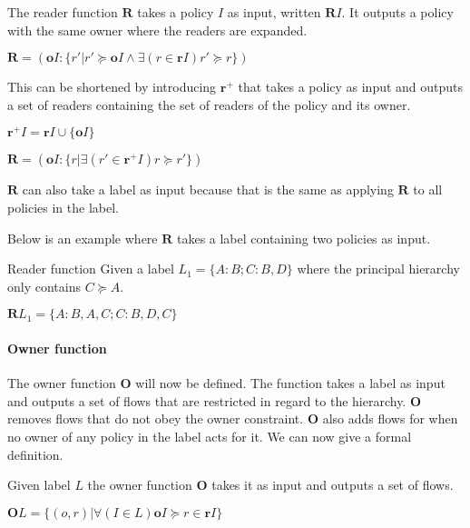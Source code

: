 \begin{definition}
  The reader function $\textbf{R}$ takes a policy $I$ as input, written $\textbf{R}I$.
  It outputs a policy with the same owner where the readers are expanded.
  \begin{center}
    $\textbf{R} = (\textbf{o}I : \{r' | r' \succeq \textbf{o}I \wedge \exists(r \in \textbf{r}I) r' \succeq r \})$
  \end{center}
  This can be shortened by introducing $\textbf{r}^+$ that takes a policy as input and outputs a set of readers containing the set of readers of the policy and its owner.
  \begin{center}
    $\textbf{r}^+I = \textbf{r}I \cup \{\textbf{o}I\}$
  \end{center}
  \begin{center}
    $\textbf{R} = (\textbf{o}I : \{r | \exists(r' \in \textbf{r}^+I) r \succeq r' \})$
  \end{center}
  $\textbf{R}$ can also take a label as input because that is the same as applying $\textbf{R}$ to all policies in the label.
\end{definition}

Below is an example where $\textbf{R}$ takes a label containing two policies as input.
\begin{example}{Reader function}
  Given a label $L_1 = \{A:B; C:B,D\}$ where the principal hierarchy only contains $C \succeq A$.
  \begin{center}
    $\textbf{R}L_1 = \{A:B,A,C; C:B,D,C\}$
  \end{center}
\end{example}

\paragraph{Owner function}
The owner function $\textbf{O}$ will now be defined.
The function takes a label as input and outputs a set of flows that are restricted in regard to the \principal{} hierarchy.
$\textbf{O}$ removes flows that do not obey the owner constraint.
$\textbf{O}$ also adds flows for \principals{} when no owner of any policy in the label acts for it.
We can now give a formal definition.
\begin{definition}
  Given label $L$ the owner function $\textbf{O}$ takes it as input and outputs a set of flows.
  \begin{center}
    $\textbf{O}L = \{(o,r) | \forall (I \in L) \textbf{o}I \succeq r \in \textbf{r}I\}$
  \end{center}
\end{definition}
